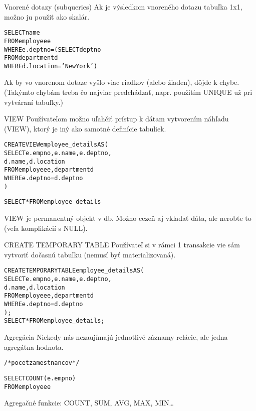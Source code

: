 \documentclass[12pt]{beamer}
\def\blue#1{\textcolor{Cerulean}{#1}}
\begin{document}
\begin{frame}[fragile]{Vnorené dotazy (subqueries)}
Ak je výsledkom vnoreného dotazu tabuľka 1x1, možno ju použiť ako skalár.
\begin{alltt}
SELECT name
FROM employee e
WHERE \alert{e.deptno =} \blue{(SELECT deptno
                  FROM department d
                  WHERE d.location = 'New York')}
\end{alltt}
Ak by vo vnorenom dotaze vyšlo viac riadkov (alebo žiaden), dôjde k chybe.\\
(Takýmto chybám treba čo najviac predchádzať, napr. použitím UNIQUE už pri vytváraní tabuľky.)
\end{frame}

\begin{frame}[fragile]{VIEW}
Používateľom možno uľahčiť prístup k dátam vytvorením náhľadu (VIEW), ktorý je iný ako samotné definície tabuliek.
\begin{alltt}
\alert{CREATE VIEW} \blue{employee_details} AS (
    SELECT e.empno, e.name, e.deptno,
           d.name, d.location
    FROM employee e, department d
    WHERE e.deptno = d.deptno
)

SELECT * FROM \blue{employee_details}
\end{alltt}
VIEW je permanentný objekt v db. Možno cezeň aj vkladať dáta, ale nerobte to (veľa komplikácií s NULL).
\end{frame}

\begin{frame}[fragile]{CREATE TEMPORARY TABLE}
Používateľ si v rámci 1 transakcie vie sám vytvoriť dočasnú tabuľku (nemusí byť materializovaná).
\begin{alltt}
\alert{CREATE TEMPORARY TABLE} \blue{employee_details} AS (
    SELECT e.empno, e.name, e.deptno,
           d.name, d.location
    FROM employee e, department d
    WHERE e.deptno = d.deptno
);
SELECT * FROM \blue{employee_details};
\end{alltt}
\end{frame}

\begin{frame}[fragile]{Agregácia}
Niekedy nás nezaujímajú jednotlivé záznamy relácie, ale jedna agregátna hodnota.
\begin{alltt}
/* pocet zamestnancov */

SELECT \alert{COUNT}(e.empno)
FROM employee e
\end{alltt}
Agregačné funkcie: COUNT, SUM, AVG, MAX, MIN\dots
\end{frame}
\end{document}
